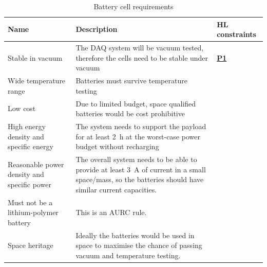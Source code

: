 \documentclass[draft]{report}
\newcommand{\hlreq}[1]{\hyperlink{req-#1}{\textbf{#1}}}
\begin{document}
\begin{table}[H]
  \centering
  \begin{tabular}{|L{0.2\textwidth}|L{0.495\textwidth}|L{0.2\textwidth}|}
    \hline
    \textbf{Name}                               & \textbf{Description}                                                                                                                                               & \textbf{HL constraints} \\ \hline
    Stable in vacuum                            & The DAQ system will be vacuum tested, therefore the cells need to be stable under vacuum                                                                           & \hlreq{P1}              \\\hline
    Wide temperature range                      & Batteries must survive temperature testing                                                                                                                         &                         \\\hline
    Low cost                                    & Due to limited budget, space qualified batteries would be cost prohibitive                                                                                         &                         \\\hline
    High energy density and specific energy     & The system needs to support the payload for at least \SI{2}{\hour} at the worst-case power budget without recharging                                               &                         \\\hline
    Reasonable power density and specific power & The overall system needs to be able to provide at least \SI{3}{\ampere} of current in a small space/mass, so the batteries should have similar current capacities. &                         \\\hline
    Must not be a lithium-polymer battery       & This is an AURC rule.                                                                                                                                              &                         \\\hline
    Space heritage                              & Ideally the batteries would be used in space to maximise the chance of passing vacuum and temperature testing.                                                     &                         \\\hline
  \end{tabular}
  \caption{Battery cell requirements}
  \label{tabl:battery-requirements}
\end{table}
\end{document}
